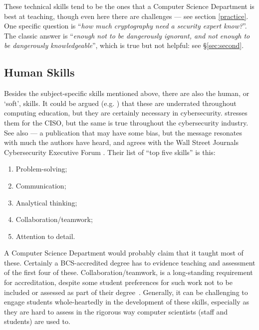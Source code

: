 \documentclass[conference]{IEEEtran}
\begin{document}
\begin{itemize}
These technical skills tend to be the ones that a Computer Science Department is best at teaching, though even here there are challenges --- see section \ref{practice}. One specific question is ``{\emph{how much cryptography need a security expert know?}}''. The classic answer is ``{\emph{enough not to be dangerously ignorant, and not enough to be dangerously knowledgeable}}'', which is true but not helpful: see \S\ref{sec:second}.
\end{itemize}
\subsection{Human Skills}\label{sec:human}
Besides the subject-specific skills mentioned above, there are also the human, or `soft', skills. It could be argued (e.g. \cite{Palkar2013a}) that these are underrated throughout computing education, but they are certainly necessary in cybersecurity.
\cite{Froehlich2019a} stresses them for the CISO, but the same is true throughout the cybersecurity industry. See also \cite{InfoSec2019a} ---  a publication that may have some bias, but the message resonates with much the authors have heard, and agrees with the Wall Street Journals Cybersecurity Executive Forum \cite{WallStreetJournal2018c}. Their list of ``top five skills'' is this:
\begin{enumerate}
\item    Problem-solving;
\item    Communication;
\item    Analytical thinking;
\item    Collaboration/teamwork;
\item    Attention to detail.
\end{enumerate}

A Computer Science Department would probably claim that it taught most of these. Certainly a BCS-accredited degree has to evidence teaching and assessment of the first four of these. Collaboration/teamwork, is a long-standing requirement for accreditation, despite some student preferences %
for such work not to be included or assessed as part of their degree~\cite{Cricketal2020a}. Generally, it can be challenging to engage students whole-heartedly in the development of these skills, especially as they are hard to assess in the rigorous way computer scientists (staff and students) are used to. 
\end{document}
